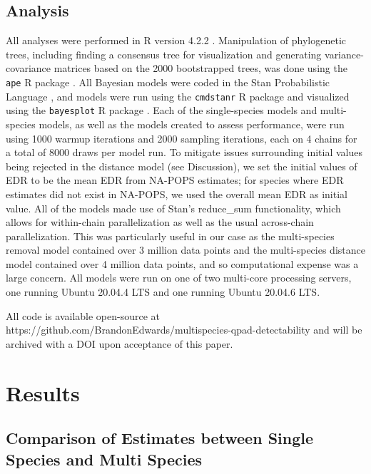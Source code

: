 \documentclass[12pt]{article}
\begin{document}
\subsection{Analysis}
\par All analyses were performed in R version 4.2.2 \citep{r_core_team_r_2022}.
Manipulation of phylogenetic trees, including finding a consensus tree for visualization and generating variance-covariance matrices based on the 2000 bootstrapped trees, was done using the \texttt{ape} R package \citep{paradis_ape_2019}.
All Bayesian models were coded in the Stan Probabilistic Language \cite{stan_development_team_stan_2019}, and models were run using the \texttt{cmdstanr} R package \citep{gabry_cmdstanr_2022} and visualized using the \texttt{bayesplot} R package \citep{gabry_visualization_2019}.
Each of the single-species models and multi-species models, as well as the models created to assess performance, were run using 1000 warmup iterations and 2000 sampling iterations, each on 4 chains for a total of 8000 draws per model run.
To mitigate issues surrounding initial values being rejected in the distance model (see Discussion), we set the initial values of EDR to be the mean EDR from NA-POPS \citep{edwards_point_2023} estimates; for species where EDR estimates did not exist in NA-POPS, we used the overall mean EDR as initial value.
All of the models made use of Stan's reduce\_sum functionality, which allows for within-chain parallelization as well as the usual across-chain parallelization.
This was particularly useful in our case as the multi-species removal model contained over 3 million data points and the multi-species distance model contained over 4 million data points, and so computational expense was a large concern.
All models were run on one of two multi-core processing servers, one running Ubuntu 20.04.4 LTS and one running Ubuntu 20.04.6 LTS.

\par All code is available open-source at https://github.com/BrandonEdwards/multispecies-qpad-detectability and will be archived with a DOI upon acceptance of this paper.


\section{Results}

\subsection{Comparison of Estimates between Single Species and Multi Species}
\end{document}
